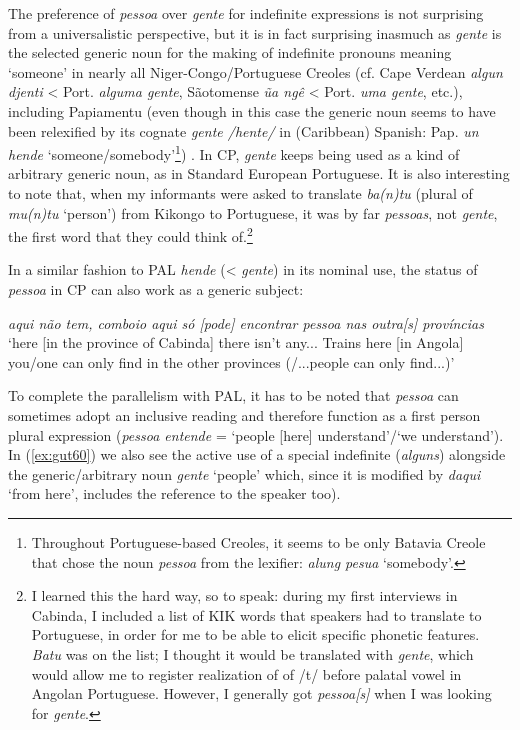 \documentclass[output=paper,colorlinks,citecolor=brown]{langscibook}
\begin{document}
\begin{sloppypar}
The preference of \textit{pessoa} over \textit{gente} for indefinite expressions is not surprising from a universalistic perspective, but it is in fact surprising inasmuch as \textit{gente} is the selected generic noun for the making of indefinite pronouns meaning ‘someone’ in nearly all Niger\hyp Congo\slash Portuguese Creoles (cf. Cape Verdean \textit{algun djenti} < Port. \textit{alguma gente}, Sãotomense \textit{ũa ngê} < Port. \textit{uma gente}, etc.), including Papiamentu (even though in this case the generic noun seems to have been relexified by its cognate \textit{gente /hente/} in (Caribbean) Spanish: Pap. \textit{un hende} ‘someone\slash somebody’\footnote{Throughout Portuguese-based Creoles, it seems to be only Batavia Creole that chose the noun \textit{pessoa} from the lexifier: \textit{alung pesua} ‘somebody’.})  \citep{HaspelmathAPiCS2013}. In CP, \textit{gente} keeps being used as a kind of arbitrary generic noun, as in Standard European Portuguese. It is also interesting to note that, when my informants were asked to translate \textit{ba(n)tu} (plural of \textit{mu(n)tu} ‘person’) from Kikongo to Portuguese, it was by far \textit{pessoas}, not \textit{gente}, the first word that they could think of.\footnote{I learned this the hard way, so to speak: during my first interviews in Cabinda, I included a list of KIK words that speakers had to translate to Portuguese, in order for me to be able to elicit specific phonetic features. \textit{Batu} was on the list; I thought it would be translated with \textit{gente}, which would allow me to register realization of of /t/ before palatal vowel in Angolan Portuguese. However, I generally got \textit{pessoa[s]} when I was looking for \textit{gente}.}
\end{sloppypar}

In a similar fashion to PAL \textit{hende} (< \textit{gente}) in its nominal use, the status of \textit{pessoa} in CP can also work as a generic subject:
  
\ea \label{ex:gut59}
    \textit{aqui não tem, comboio aqui só [pode] encontrar pessoa nas outra[s] províncias}\\
    ‘here [in the province of Cabinda] there isn’t any... Trains here [in Angola] you/one can only find in the other provinces (/...people can only find...)’
\z

To complete the parallelism with PAL, it has to be noted that \textit{pessoa} can sometimes adopt an inclusive reading and therefore function as a first person plural expression (\textit{pessoa entende} = `people [here] understand'\slash`we understand'). In (\ref{ex:gut60}) we also see the active use of a special indefinite (\textit{alguns}) alongside the generic\slash arbitrary noun \textit{gente} ‘people’ which, since it is modified by \textit{daqui} ‘from here’, includes the reference to the speaker too).
\end{document}
